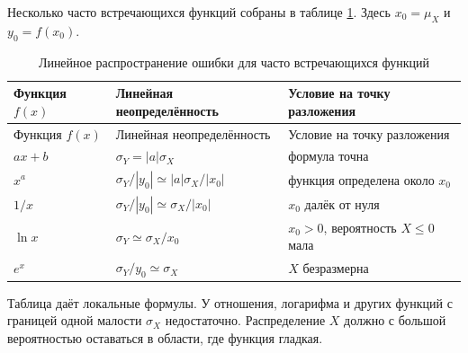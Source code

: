 \documentclass[
  russian,
  11pt,
  a4paper,
  open=any]{scrbook}
\begin{document}
Несколько часто встречающихся функций собраны в таблице
\ref{tbl-error-propagation-functions}. Здесь \(x_0=\mu_X\) и
\(y_0=f(x_0)\).

\begin{longtable}[]{@{}
  >{\raggedright\arraybackslash}p{}
  >{\raggedright\arraybackslash}p{}
  >{\raggedright\arraybackslash}p{}@{}}
\caption{Линейное распространение ошибки для часто встречающихся
функций}\label{tbl-error-propagation-functions}\tabularnewline
\toprule\noalign{}
\begin{minipage}[b]{\linewidth}\raggedright
Функция \(f(x)\)
\end{minipage} & \begin{minipage}[b]{\linewidth}\raggedright
Линейная неопределённость
\end{minipage} & \begin{minipage}[b]{\linewidth}\raggedright
Условие на точку разложения
\end{minipage} \\
\midrule\noalign{}
\endfirsthead
\toprule\noalign{}
\begin{minipage}[b]{\linewidth}\raggedright
Функция \(f(x)\)
\end{minipage} & \begin{minipage}[b]{\linewidth}\raggedright
Линейная неопределённость
\end{minipage} & \begin{minipage}[b]{\linewidth}\raggedright
Условие на точку разложения
\end{minipage} \\
\midrule\noalign{}
\endhead
\bottomrule\noalign{}
\endlastfoot
\(ax+b\) & \(\sigma_Y=|a|\sigma_X\) & формула точна \\
\(x^a\) & \(\sigma_Y/|y_0|\simeq |a|\sigma_X/|x_0|\) & функция
определена около \(x_0\) \\
\(1/x\) & \(\sigma_Y/|y_0|\simeq\sigma_X/|x_0|\) & \(x_0\) далёк от
нуля \\
\(\ln x\) & \(\sigma_Y\simeq\sigma_X/x_0\) & \(x_0>0\), вероятность
\(X\le0\) мала \\
\(e^x\) & \(\sigma_Y/y_0\simeq\sigma_X\) & \(X\) безразмерна \\
\end{longtable}

Таблица даёт локальные формулы. У отношения, логарифма и других функций
с границей одной малости \(\sigma_X\) недостаточно. Распределение \(X\)
должно с большой вероятностью оставаться в области, где функция гладкая.
\end{document}
